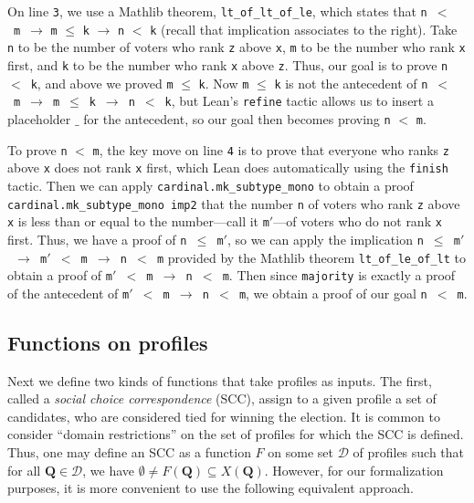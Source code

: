 \documentclass[runningheads]{llncs}
\begin{document}
On line \texttt{3}, we use a Mathlib theorem, \texttt{lt\_of\_lt\_of\_le}, which states that \texttt{n}~$<$~\texttt{m}~$\to$ \texttt{m} $\leq$ \texttt{k} $\to$ \texttt{n} $<$ \texttt{k} (recall that implication associates to the right). Take \texttt{n} to be the number of voters who rank \texttt{z} above \texttt{x}, \texttt{m} to be the number who rank \texttt{x} first, and \texttt{k} to be the number  who rank \texttt{x} above \texttt{z}. Thus, our goal is to prove \texttt{n}~$<$~\texttt{k}, and above we proved  \texttt{m} $\leq$ \texttt{k}. Now \texttt{m} $\leq$ \texttt{k} is not the antecedent of \texttt{n}~$<$~\texttt{m}~$\to$~\texttt{m}~$\leq$~\texttt{k}~$\to$~\texttt{n}~$<$~\texttt{k}, but Lean's \texttt{refine} tactic allows us to insert a placeholder $\_$ for the antecedent, so our goal then becomes proving  \texttt{n} $<$ \texttt{m}. 

To prove \texttt{n} $<$ \texttt{m}, the key move on line \texttt{4} is to prove that everyone who ranks \texttt{z} above \texttt{x} does not rank \texttt{x} first, which Lean does automatically using the \texttt{finish} tactic. Then we can apply \texttt{cardinal.mk\_subtype\_mono} to obtain a proof \texttt{cardinal.mk\_subtype\_mono imp2} that the number \texttt{n} of voters who rank \texttt{z} above \texttt{x} is less than or equal to the number---call it \texttt{m}$'$---of voters who do not rank \texttt{x} first. Thus, we have a proof of \texttt{n~$\leq$~m$'$}, so we can apply the implication  \texttt{n~$\leq$~m$'$~$\to$~m$'$~$<$~m~$\to$~n~$<$ m} provided by the Mathlib theorem \texttt{lt\_of\_le\_of\_lt} to obtain a proof of \texttt{m$'$  $<$ m $\to$ n $<$ m}. Then since \texttt{majority} is exactly a proof of the antecedent of \texttt{m$'$  $<$ m $\to$ n $<$ m}, we obtain a proof of our goal \texttt{n $<$ m}.




\subsection{Functions on profiles}

Next we define two kinds of functions that take profiles as inputs. The first, called a \textit{social choice correspondence} (SCC), assign to a given profile a set of candidates, who are considered tied for winning the election. It is common to consider ``domain restrictions'' on the set of profiles for which the SCC is defined. Thus, one may define an SCC as a function $F$ on some set $\mathcal{D}$ of profiles such that for all $\mathbf{Q}\in\mathcal{D}$, we have ${\emptyset\neq F(\mathbf{Q})\subseteq X(\mathbf{Q})}$. However, for our formalization purposes, it is more convenient to use the following equivalent approach.
\end{document}
